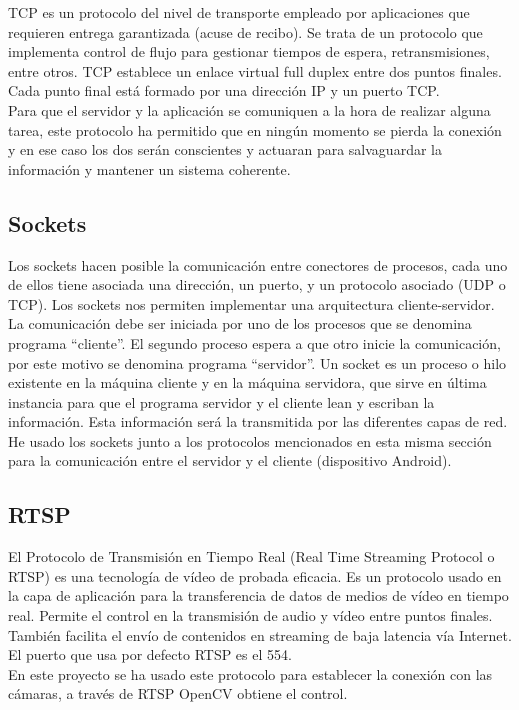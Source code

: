TCP es un protocolo del nivel de transporte empleado por aplicaciones que requieren entrega garantizada (acuse de recibo). Se trata de un protocolo que implementa control de flujo para gestionar tiempos de espera, retransmisiones, entre otros. TCP establece un enlace virtual full duplex entre dos puntos finales. Cada punto final está formado por una dirección IP y un puerto TCP.\\
Para que el servidor y la aplicación se comuniquen a la hora de realizar alguna tarea, este protocolo ha permitido que en ningún momento se pierda la conexión y en ese caso los dos serán conscientes y actuaran para salvaguardar la información y mantener un sistema coherente.

\subsection{Sockets}

Los sockets hacen posible la comunicación entre conectores de procesos, cada uno de ellos tiene asociada una dirección, un puerto, y un protocolo asociado (UDP o TCP). Los sockets nos permiten implementar una arquitectura cliente-servidor. La comunicación debe ser iniciada por uno de los procesos que se denomina programa ``cliente''. El segundo proceso espera a que otro inicie la comunicación, por este motivo se denomina programa ``servidor''. Un socket es un proceso o hilo existente en la máquina cliente y en la máquina servidora, que sirve en última instancia para que el programa servidor y el cliente lean y escriban la información. Esta información será la transmitida por las diferentes capas de red.\\
He usado los sockets junto a los protocolos mencionados en esta misma sección para la comunicación entre el servidor y el cliente (dispositivo Android).

\subsection{RTSP}

El Protocolo de Transmisión en Tiempo Real (Real Time Streaming Protocol o RTSP) es una tecnología de vídeo de probada eficacia. Es un protocolo usado en la capa de aplicación para la transferencia de datos de medios de vídeo en tiempo real. Permite el control en la transmisión de audio y vídeo entre puntos finales. También facilita el envío de contenidos en streaming de baja latencia vía Internet. El puerto que usa por defecto RTSP es el 554.\\
En este proyecto se ha usado este protocolo para establecer la conexión con las cámaras, a través de RTSP OpenCV obtiene el control.



